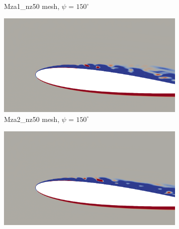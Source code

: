\begin{figure}[H]
\begin{subfigure}[b]{0.475\textwidth}
		\caption{Mza1\_nz50 mesh, $\psi$ = $150^\circ$}
		\label{fig:Mza1_50_sp_psi150}
	\end{subfigure}
	\begin{subfigure}[b]{0.475\textwidth}
		\centering
		\includegraphics[width=1\textwidth]{figures/zonal_adapt_results/vorticity_plots/v2/Mza2_50/spavg/phase_150.png}
		\caption{Mza2\_nz50 mesh, $\psi$ = $150^\circ$}
		\label{fig:Mza2_50_sp_psi150}
	\end{subfigure}	
	\begin{subfigure}[b]{0.475\textwidth}
		\centering
		\includegraphics[width=1\textwidth]{figures/zonal_adapt_results/vorticity_plots/v2/Mza2_100/spavg/phase_150.png}

\end{subfigure}
\end{figure}
